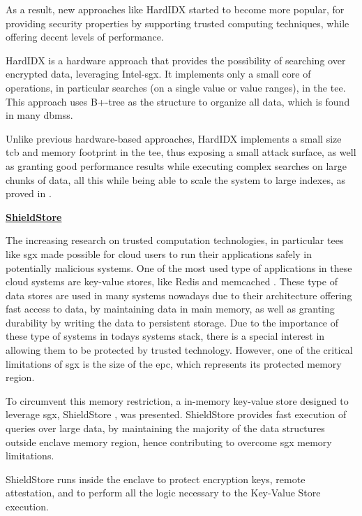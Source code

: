As a result, new approaches like HardIDX started to become more popular, for providing security properties by supporting trusted computing techniques, while offering decent levels of performance.

HardIDX \cite{hardIDXPaper} is a hardware approach that provides the possibility of searching over encrypted data, leveraging Intel-\gls{sgx}. It implements only a small core of operations, in particular searches (on a single value or value ranges), in the \gls{tee}.
This approach uses B+-tree as the structure to organize all data, which is found in many \gls{dbms}s.

Unlike previous hardware-based approaches, HardIDX implements a small size \gls{tcb} and memory footprint in the \gls{tee}, thus exposing a small attack surface, as well as granting good performance results while executing complex searches on large chunks of data, all this while being able to scale the system to large indexes, as proved in \cite{hardIDXPaper}.\newline


\underline{\textbf{ShieldStore}}

The increasing research on trusted computation technologies, in particular \gls{tee}s like \gls{sgx} made possible for cloud users to run their applications safely in potentially malicious systems. One of the most used type of applications in these cloud systems are key-value stores, like Redis \cite{redisWebsite} and memcached \cite{memcachedWebsite}. These type of data stores are used in many systems nowadays due to their architecture offering fast access to data, by maintaining data in main memory, as well as granting durability by writing the data to persistent storage.  Due to the importance of these type of systems in todays systems stack, there is a special interest in allowing them to be protected by trusted technology. However, one of the critical limitations of \gls{sgx} is the size of the \gls{epc}, which represents its protected memory region. 

To circumvent this memory restriction, a in-memory key-value store designed to leverage \gls{sgx}, ShieldStore \cite{shieldStorePaper}, was presented. ShieldStore provides fast execution of queries over large data, by maintaining the majority of the data structures outside enclave memory region, hence contributing to overcome \gls{sgx} memory limitations.

ShieldStore runs inside the enclave to protect encryption keys, remote attestation, and to perform all the logic necessary to the Key-Value Store execution.

